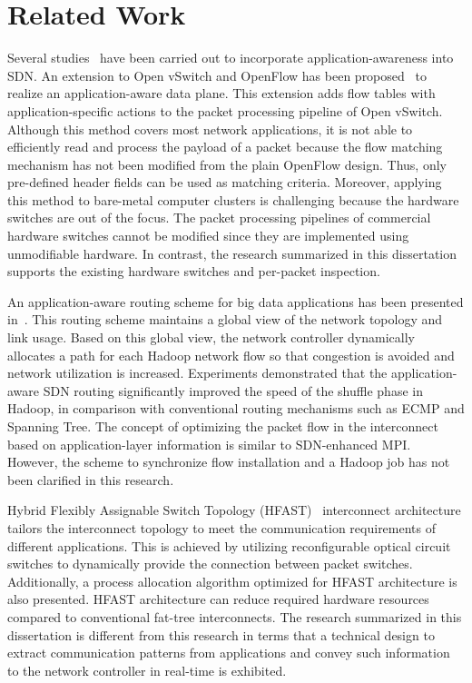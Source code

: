 \section{Related Work}\label{sec:iv-related-work}

Several studies~\autocite{Mekky2014,Cheng2014} have been carried out
to incorporate application-awareness into SDN\@. An extension to Open
vSwitch and OpenFlow has been proposed~\autocite{Mekky2014} to realize
an application-aware data plane. This extension adds flow tables with
application-specific actions to the packet processing pipeline of Open
vSwitch. Although this method covers most network applications, it is
not able to efficiently read and process the payload of a packet because
the flow matching mechanism has not been modified from the plain
OpenFlow design. Thus, only pre-defined header fields can be used as
matching criteria. Moreover, applying this method to bare-metal computer
clusters is challenging because the hardware switches are out of the
focus. The packet processing pipelines of commercial hardware switches
cannot be modified since they are implemented using unmodifiable
hardware. In contrast, the research summarized in this dissertation supports
the existing hardware switches and per-packet inspection.

An application-aware routing scheme for big data applications has been
presented in~\autocite{Cheng2014}. This routing scheme maintains a
global view of the network topology and link usage. Based on this global
view, the network controller dynamically allocates a path for each
Hadoop network flow so that congestion is avoided and network
utilization is increased. Experiments demonstrated that the
application-aware SDN routing significantly improved the speed of the
shuffle phase in Hadoop, in comparison with conventional routing
mechanisms such as ECMP and Spanning Tree. The concept of optimizing the
packet flow in the interconnect based on application-layer information
is similar to SDN-enhanced MPI\@. However, the scheme to synchronize flow
installation and a Hadoop job has not been clarified in this research.

Hybrid Flexibly Assignable Switch Topology (HFAST)~\autocite{Kamil2007}
interconnect architecture tailors the interconnect topology to meet the
communication requirements of different applications. This is achieved
by utilizing reconfigurable optical circuit switches to dynamically
provide the connection between packet switches. Additionally, a process
allocation algorithm optimized for HFAST architecture is also presented.
HFAST architecture can reduce required hardware resources compared to
conventional fat-tree interconnects. The research summarized in this
dissertation is different from this research in terms that a technical design
to extract communication patterns from applications and convey such
information to the network controller in real-time is exhibited.

